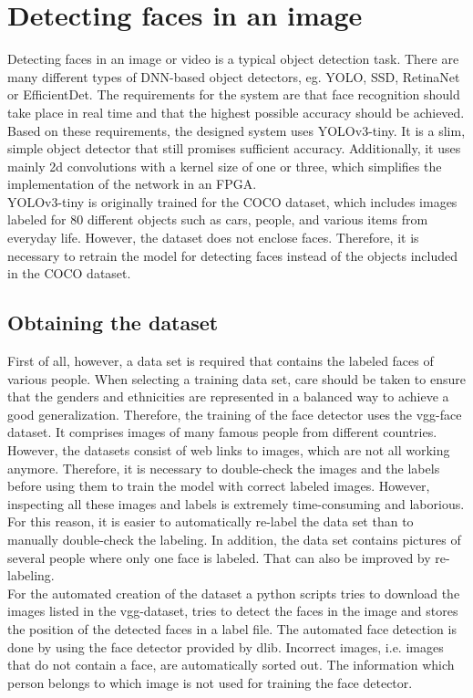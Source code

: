 \documentclass[%
a4paper,
twoside,
openany,
dvipsnames
]
{report}
\begin{document}
\section{Detecting faces in an image}
Detecting faces in an image or video is a typical object detection task. There are many different types of DNN-based object detectors, eg. YOLO, SSD, RetinaNet or EfficientDet. The requirements for the system are that face recognition should take place in real time and that the highest possible accuracy should be achieved. Based on these requirements, the designed system uses YOLOv3-tiny. It is a slim, simple object detector that still promises sufficient accuracy. Additionally, it uses mainly 2d convolutions with a kernel size of one or three, which simplifies the implementation of the network in an \gls{FPGA}. \\
YOLOv3-tiny is originally trained for the COCO dataset, which includes images labeled for 80 different objects such as cars, people, and various items from everyday life. However, the dataset does not enclose faces. Therefore, it is necessary to retrain the model for detecting faces instead of the objects included in the COCO dataset. 
\subsection{Obtaining the dataset}
First of all, however, a data set is required that contains the labeled faces of various people. When selecting a training data set, care should be taken to ensure that the genders and ethnicities are represented in a balanced way to achieve a good generalization. Therefore, the training of the face detector uses the vgg-face dataset. It comprises images of many famous people from different countries. However, the datasets consist of web links to images, which are not all working anymore. Therefore, it is necessary to double-check the images and the labels before using them to train the model with correct labeled images. However, inspecting all these images and labels is extremely time-consuming and laborious. For this reason, it is easier to automatically re-label the data set than to manually double-check the labeling. In addition, the data set contains pictures of several people where only one face is labeled. That can also be improved by re-labeling. \\
For the automated creation of the dataset a python scripts tries to download the images listed in the vgg-dataset, tries to detect the faces in the image and stores the position of the detected faces in a label file. The automated face detection is done by using the face detector provided by dlib. Incorrect images, i.e. images that do not contain a face, are automatically sorted out. The information which person belongs to which image is not used for training the face detector. \\
\end{document}
